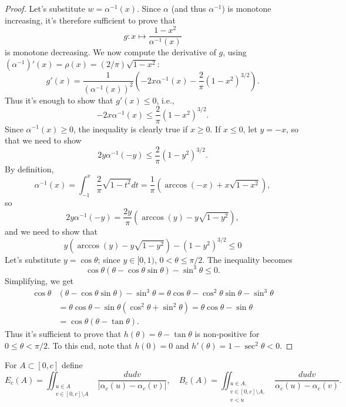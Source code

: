 \begin{proof}
Let's substitute $w=\alpha^{-1}(x)$.  Since $\alpha$ (and thus $\alpha^{-1}$) is monotone increasing, it's therefore sufficient to prove that 
$$g: x\mapsto \frac{1-x^2}{\alpha^{-1}(x)}$$ is monotone decreasing. We now compute the derivative of $g$, using $(\alpha^{-1})'(x)=\rho(x) = (2/\pi) \sqrt{1-x^2}$:
$$
g'(x) = \frac{1}{(\alpha^{-1}(x))^2 }\left(
-2x \alpha^{-1}(x) -  \frac{2}{\pi} (1-x^2)^{3/2}
\right).
$$
Thus it's enough to show that $g'(x)\leq 0$, i.e., $$
-2x\alpha^{-1}(x) \leq \frac{2}{\pi} (1-x^2)^{3/2}.$$ Since $\alpha^{-1}(x)\geq 0$, the inequality is clearly true if $x\geq  0$.  If $x\leq 0$, let $y=-x$, so that we need to show
$$
2y\alpha^{-1}(-y) \leq  \frac{2}{\pi} (1-y^2)^{3/2}.
$$
By definition, $$\alpha^{-1}(x)=\int_{-1}^{x} \frac{2}{\pi}\sqrt{1-t^2} dt = \frac{1}{\pi} \left(\arccos(-x) + x\sqrt{1-x^2}\right), $$ 
so $$2y\alpha^{-1}(-y) = \frac{2y}{\pi} \left( \arccos(y) - y\sqrt{1-y^2}\right),$$ and we need to show that
$${y} \left( \arccos(y) - y\sqrt{1-y^2}\right) 
 - (1-y^2)^{3/2}\leq 0
$$  Let's substitute $y=\cos\theta$; since $y\in [0,1)$, $0<\theta\leq \pi/2$.  The inequality becomes
$$
\cos\theta (\theta - \cos\theta \sin\theta ) - \sin^{3}\theta\leq 0.
$$
Simplifying, we get
\begin{align*}
\cos\theta &(\theta - \cos\theta \sin\theta ) - \sin^{3}\theta 
 = \theta \cos\theta -\cos^2\theta \sin\theta -\sin^3\theta \\
& = \theta \cos\theta -\sin\theta(\cos^2\theta +\sin^2\theta) 
= \theta\cos\theta -\sin\theta \\ & = \cos\theta (\theta -\tan\theta).
\end{align*}
Thus it's sufficient to prove that $h(\theta) = \theta - \tan\theta$ is non-positive for $0\leq \theta <\pi/2$. To this end, note that $h(0)=0$ and $h'(\theta)=1-\sec^2\theta<0$.
\end{proof}

For $A\subset[0,c]$ define 
$$E_c (A) = \iint_{\substack{u\in A\\v\in [0,c]\setminus A}} \frac{du dv}{|\alpha_c(u)-\alpha_c(v)|}, \quad B_c(A) = \iint_{\substack{u\in A,\\v\in [0,c]\setminus A,\\ v<u}} \frac{du dv}{\alpha_c(u)-\alpha_c(v)}.$$

